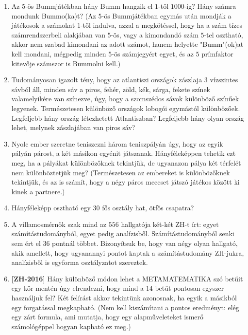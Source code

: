 \documentclass[a4paper,12pt]{article}
\begin{document}
\begin{enumerate}
        \item
        Az $5$-ös Bummjátékban hány Bumm hangzik el $1$-től $1000$-ig? Hány számra
        mondunk Bummo(ka)t? (Az $5$-ös Bummjátékban egymás után mondják a játékosok a
        számokat $1$-től indulva, azzal a megkötéssel, hogy ha a szám tízes
        számrendszerbeli alakjában van $5$-ös, vagy a kimondandó szám $5$-tel
        osztható, akkor nem szabad kimondani az adott számot, hanem helyette
        "Bumm"(ok)at kell mondani, mégpedig minden $5$-ös számjegyért egyet, és
        az $5$ prímfaktor kitevője számszor is Bummolni kell.)

        \item
        Tudományosan igazolt tény, hogy az atlantiszi országok zászlaja $3$
        vízszintes sávból áll, minden sáv a piros, fehér, zöld, kék, sárga, fekete
        színek valamelyikére van színezve, úgy, hogy a szomszédos sávok különböző
        színűek legyenek. Természetesen különböző országok lobogói egymástól
        különbözőek. Legfeljebb hány ország létezhetett Atlantiszban?  Legfeljebb
        hány olyan ország lehet, melynek zászlajában van piros sáv?

        \item
        Nyolc ember szeretne teniszezni három teniszpályán úgy, hogy az egyik
        pályán párost, a két másikon egyénit játszanak. Hányféleképpen tehetik ezt
        meg, ha a pályákat különbözőknek tekintjük, de ugyanazon pálya két
        térfelét nem különböztetjük meg? (Természetesen az embereket is
        különbözőknek tekintjük, és az is számít, hogy a négy páros meccset játszó
        játékos között ki kinek a partnere.)

        \item
        Hányféleképp osztható egy $30$ fős osztály hat, ötfős
        csapatra?

        \item
        A villamosmérnök szak mind az $556$ hallgatója két-két ZH-t írt: egyet
        számítástudományból, egyet pedig analízisből. Számítástudományból senki sem
        ért el $36$ pontnál többet. Bizonyítsuk be, hogy van négy olyan hallgató,
        akik amellett, hogy ugyanannyi pontot kaptak a számítástudomány ZH-jukra,
        analízisből is egyforma osztályzatot szereztek.

        \item \textbf{[ZH-2016]}
        Hány különböző módon lehet
        a METAMATEMATIKA szó betűit egy kör mentén úgy elrendezni, hogy mind a $14$
        betűt pontosan egyszer használjuk fel? Két felírást akkor tekintünk
        azonosnak, ha egyik a másikból egy forgatással megkapható.
        (Nem kell kiszámítani a pontos eredményt: elég egy zárt formula,
        ami mutatja, hogy egy alapműveleteket ismerő számológéppel hogyan
        kapható ez meg.)


\end{enumerate}
\end{document}
